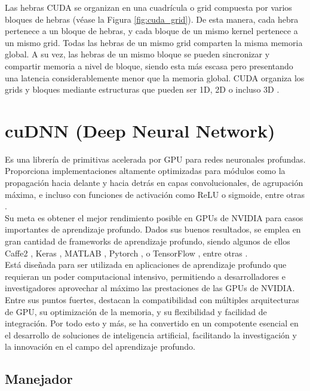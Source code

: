 Las hebras CUDA se organizan en una cuadrícula o grid compuesta por varios bloques de hebras (véase la Figura \ref{fig:cuda_grid}). De esta manera, cada hebra pertenece a un bloque de hebras, y cada bloque de un mismo kernel pertenece a un mismo grid. Todas las hebras de un mismo grid comparten la misma memoria global. A su vez, las hebras de un mismo bloque se pueden sincronizar y compartir memoria a nivel de bloque, siendo esta más escasa pero presentando una latencia considerablemente menor que la memoria global. CUDA organiza los grids y bloques mediante estructuras que pueden ser 1D, 2D o incluso 3D \cite{Professional_CUDA_C}.

\section{cuDNN (Deep Neural Network)}

Es una librería de primitivas acelerada por GPU para redes neuronales profundas. Proporciona implementaciones altamente optimizadas para módulos como la propagación hacia delante y hacia detrás en capas convolucionales, de agrupación máxima, e incluso con funciones de activación como ReLU o sigmoide, entre otras \cite{cuDNN}. \\
Su meta es obtener el mejor rendimiento posible en GPUs de NVIDIA para casos importantes de aprendizaje profundo. Dados sus buenos resultados, se emplea en gran cantidad de frameworks de aprendizaje profundo, siendo algunos de ellos Caffe2 \cite{Caffe2}, Keras \cite{Keras}, MATLAB \cite{Matlab}, Pytorch \cite{Pytorch}, o TensorFlow \cite{Tensorflow}, entre otras \cite{cuDNN_librerias}. \\
Está diseñada para ser utilizada en aplicaciones de aprendizaje profundo que requieran un poder computacional intensivo, permitiendo a desarrolladores e investigadores aprovechar al máximo las prestaciones de las GPUs de NVIDIA. Entre sus puntos fuertes, destacan la compatibilidad con múltiples arquitecturas de  GPU, su optimización de la memoria, y su flexibilidad y facilidad de integración. Por todo esto y más, se ha convertido en un compotente esencial en el desarrollo de soluciones de inteligencia artificial, facilitando la investigación y la innovación en el campo del aprendizaje profundo.


\subsection{Manejador}


